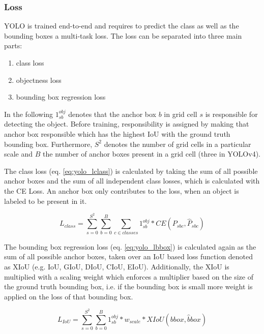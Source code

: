 \subsubsection{Loss}

\ac{YOLO} is trained end-to-end and requires to predict the class as well as the bounding boxes a multi-task loss.
The loss can be separated into three main parts:

\begin{enumerate}
    \item class loss
    \item objectness loss
    \item bounding box regression loss
\end{enumerate}

In the following $1_{sb}^{obj}$ denotes that the anchor box $b$ in grid cell $s$ is responsible for detecting the object.
Before training, responsibility is assigned by making that anchor box responsible which has the highest \ac{IoU} with the ground truth bounding box.
Furthermore, $S^2$ denotes the number of grid cells in a particular scale and $B$ the number of anchor boxes present in a grid cell (three in \ac{YOLOv4}).

The class loss (eq. \ref{eq:yolo_lclass}) is calculated by taking the sum of all possible anchor boxes and the sum of all independent class losses, which is calculated with the \ac{CE} Loss.
An anchor box only contributes to the loss, when an object is labeled to be present in it.

\begin{equation}
    L_{class} = \sum_{s=0}^{S^2} \sum_{b=0}^B \sum_{c \in classes} 1_{sb}^{obj} * CE(P_{sbc}, \hat{P}_{sbc})
    \label{eq:yolo_lclass}
\end{equation}

The bounding box regression loss (eq. \ref{eq:yolo_lbbox}) is calculated again as the sum of all possible anchor boxes, taken over an \ac{IoU} based loss function denoted as XIoU (e.g. \ac{IoU}, \ac{GIoU}, \ac{DIoU}, \ac{CIoU}, \ac{EIoU}).
Additionally, the XIoU is multiplied with a scaling weight which enforces a multiplier based on the size of the ground truth bounding box, i.e. if the bounding box is small more weight is applied on the loss of that bounding box.

\begin{equation}
    L_{IoU} = \sum_{s=0}^{S^2}\sum_{b=0}^{B} 1^{obj}_{sb} * w_{scale} * XIoU(bbox, \hat{b}box)
    \label{eq:yolo_lbbox}
\end{equation}

